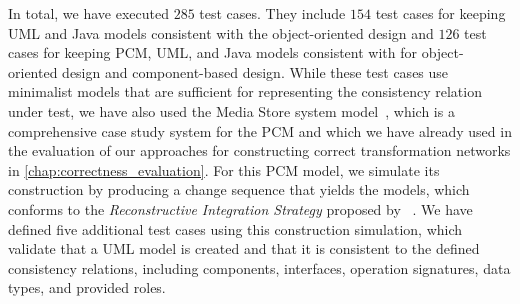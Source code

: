 In total, we have executed $285$ test cases.
They include $154$ test cases for keeping \gls{UML} and Java models consistent with the object-oriented design \commonalities and $126$ test cases for keeping \gls{PCM}, \gls{UML}, and Java models consistent with \commonalities for object-oriented design and component-based design.
While these test cases use minimalist models that are sufficient for representing the consistency relation under test, we have also used the Media Store system model~\cite{strittmatter2016a}, which is a comprehensive case study system for the \gls{PCM} and which we have already used in the evaluation of our approaches for constructing correct transformation networks in \autoref{chap:correctness_evaluation}.
For this \gls{PCM} model, we simulate its construction by producing a change sequence that yields the models, which conforms to the \emph{Reconstructive Integration Strategy} proposed by \citeauthor{langhammer2017a}~.
We have defined five additional test cases using this construction simulation, which validate that a \gls{UML} model is created and that it is consistent to the defined consistency relations, including components, interfaces, operation signatures, data types, and provided roles.





